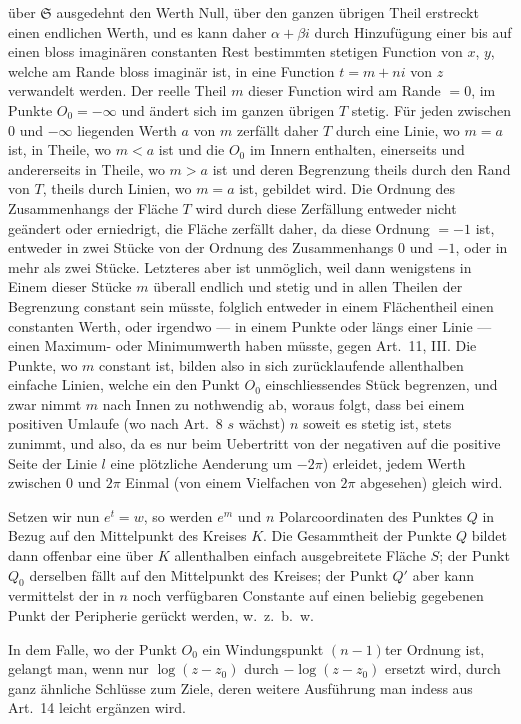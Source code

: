 \documentclass[12pt,a4paper]{article}
\begin{document}
über $\mathfrak{S}$ ausgedehnt den Werth Null, über den ganzen übrigen Theil erstreckt einen endlichen Werth, und es kann daher $\alpha + \beta i$ durch Hinzufügung einer bis auf einen bloss imaginären constanten Rest bestimmten stetigen Function von $x$, $y$, welche am Rande bloss imaginär ist, in eine Function $t = m + ni$ von $z$ verwandelt werden. Der reelle Theil $m$ dieser Function wird am Rande $= 0$, im Punkte $O_0 = -\infty$ und ändert sich im ganzen übrigen $T$ stetig. Für jeden zwischen $0$ und $-\infty$ liegenden Werth $a$ von $m$ zerfällt daher $T$ durch eine Linie, wo $m = a$ ist, in Theile, wo $m < a$ ist und die $O_0$ im Innern enthalten, einerseits und andererseits in Theile, wo $m > a$ ist und deren Begrenzung theils durch den Rand von $T$, theils durch Linien, wo $m = a$ ist, gebildet wird. Die Ordnung des Zusammenhangs der Fläche $T$ wird durch diese Zerfällung entweder nicht geändert oder erniedrigt, die Fläche zerfällt daher, da diese Ordnung $= -1$ ist, entweder in zwei Stücke von der Ordnung des Zusammenhangs $0$ und $-1$, oder in mehr als zwei Stücke. Letzteres aber ist unmöglich, weil dann wenigstens in Einem dieser Stücke $m$ überall endlich und stetig und in allen Theilen der Begrenzung constant sein müsste, folglich entweder in einem Flächentheil einen constanten Werth, oder irgendwo --- in einem Punkte oder längs einer Linie --- einen Maximum- oder Minimumwerth haben müsste, gegen Art.~11, III. Die Punkte, wo $m$ constant ist, bilden also in sich zurücklaufende allenthalben einfache Linien, welche ein den Punkt $O_0$ einschliessendes Stück begrenzen, und zwar nimmt $m$ nach Innen zu nothwendig ab, woraus folgt, dass bei einem positiven Umlaufe (wo nach Art.~8 $s$ wächst) $n$ soweit es stetig ist, stets zunimmt, und also, da es nur beim Uebertritt von der negativen auf die positive Seite der Linie $l$ eine plötzliche Aenderung um $-2\pi$) erleidet, jedem Werth zwischen $0$ und $2\pi$ Einmal (von einem Vielfachen von $2\pi$ abgesehen) gleich wird.

Setzen wir nun $e^t = w$, so werden $e^m$ und $n$ Polarcoordinaten des Punktes $Q$ in Bezug auf den Mittelpunkt des Kreises $K$. Die Gesammtheit der Punkte $Q$ bildet dann offenbar eine über $K$ allenthalben einfach ausgebreitete Fläche $S$; der Punkt $Q_0$ derselben fällt auf den Mittelpunkt des Kreises; der Punkt $Q'$ aber kann vermittelst der in $n$ noch verfügbaren Constante auf einen beliebig gegebenen Punkt der Peripherie gerückt werden, w.~z.~b.~w.

In dem Falle, wo der Punkt $O_0$ ein Windungspunkt $(n - 1)$ter Ordnung ist, gelangt man, wenn nur $\log(z - z_0)$ durch $-\log(z - z_0)$ ersetzt wird, durch ganz ähnliche Schlüsse zum Ziele, deren weitere Ausführung man indess aus Art.~14 leicht ergänzen wird.
\end{document}
